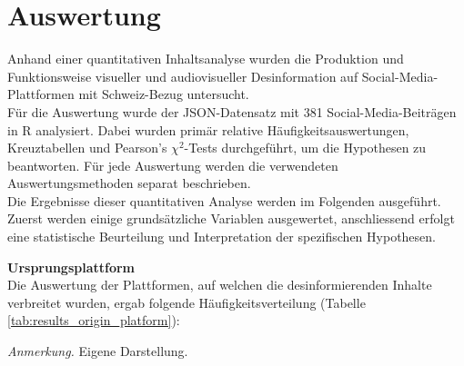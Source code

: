 \documentclass[12pt,a4paper]{article}        %
\begin{document}
\pagebreak
\section{Auswertung}
\label{sec:results}
Anhand einer quantitativen Inhaltsanalyse wurden die Produktion und Funktionsweise visueller und audiovisueller Desinformation auf Social-Media-Plattformen mit Schweiz-Bezug untersucht.\\
Für die Auswertung wurde der JSON-Datensatz mit 381 Social-Media-Beiträgen in R analysiert. Dabei wurden primär relative Häufigkeitsauswertungen, Kreuztabellen und Pearson’s \(\chi^2\)-Tests durchgeführt, um die Hypothesen zu beantworten. Für jede Auswertung werden die verwendeten Auswertungsmethoden separat beschrieben.\\
Die Ergebnisse dieser quantitativen Analyse werden im Folgenden ausgeführt. Zuerst werden einige grundsätzliche Variablen ausgewertet, anschliessend erfolgt eine statistische Beurteilung und Interpretation der spezifischen Hypothesen.

\textbf{Ursprungsplattform}\\
Die Auswertung der Plattformen, auf welchen die desinformierenden Inhalte verbreitet wurden, ergab folgende Häufigkeitsverteilung (Tabelle \ref{tab:results_origin_platform}):

\begin{table}[H]
  \caption{\textit{Relative Häufigkeitsverteilung der Ursprungsplattformen der desinformierenden Beiträge in \%}}
  \label{tab:results_origin_platform}
  \centering
  \footnotesize\textit{Anmerkung.} Eigene Darstellung.
\end{table}
\end{document}
